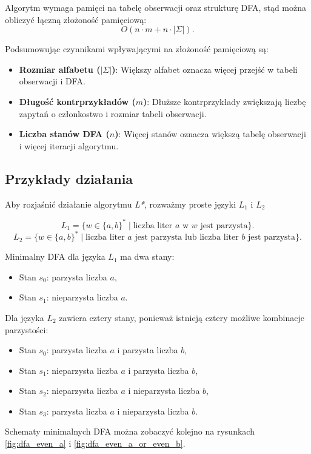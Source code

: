 Algorytm wymaga pamięci na tabelę obserwacji oraz strukturę DFA, stąd można obliczyć łączną złożoność pamięciową:
\[
O(n \cdot m + n \cdot |\Sigma|).
\]

Podsumowując czynnikami wpływającymi na złożoność pamięciową są:
\begin{itemize}
    \item \textbf{Rozmiar alfabetu (\(|\Sigma|\))}: Większy alfabet oznacza więcej przejść w tabeli obserwacji i DFA.
    \item \textbf{Długość kontrprzykładów (\(m\))}: Dłuższe kontrprzykłady zwiększają liczbę zapytań o członkostwo i rozmiar tabeli obserwacji.
    \item \textbf{Liczba stanów DFA (\(n\))}: Więcej stanów oznacza większą tabelę obserwacji i więcej iteracji algorytmu.
\end{itemize}

\subsection{Przykłady działania}

Aby rozjaśnić działanie algorytmu \textit{L*}, rozważmy proste języki $L_1$ i $L_2$

\[
L_1 = \{ w \in \{a, b\}^* \mid \text{liczba liter } a \text{ w } w \text{ jest parzysta} \}.
\]
\[
L_2 = \{ w \in \{a, b\}^* \mid \text{liczba liter } a \text{ jest parzysta lub liczba liter } b \text{ jest parzysta} \}.
\]

Minimalny DFA dla języka $L_1$ ma dwa stany:
\begin{itemize}
    \item Stan $s_0$: parzysta liczba $a$,
    \item Stan $s_1$: nieparzysta liczba $a$.
\end{itemize}

Dla języka $L_2$ zawiera cztery stany, ponieważ istnieją cztery możliwe kombinacje parzystości:
\begin{itemize}
    \item Stan $s_0$: parzysta liczba $a$ i parzysta liczba $b$,
    \item Stan $s_1$: nieparzysta liczba $a$ i parzysta liczba $b$,
    \item Stan $s_2$: nieparzysta liczba $a$ i nieparzysta liczba $b$,
    \item Stan $s_3$: parzysta liczba $a$ i nieparzysta liczba $b$.
\end{itemize}

Schematy minimalnych DFA można zobaczyć kolejno na rysunkach \ref{fig:dfa_even_a} i \ref{fig:dfa_even_a_or_even_b}.

